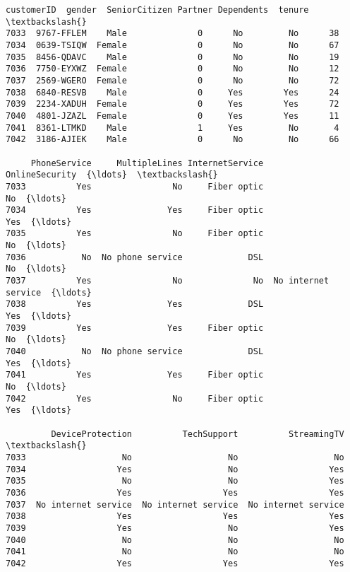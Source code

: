 \documentclass[11pt]{article}
\makeatletter
\newcommand{\boxspacing}{\kern\kvtcb@left@rule\kern\kvtcb@boxsep}
\newcommand{\prompt}[4]{
        {\ttfamily\llap{{\color{#2}[#3]:\hspace{3pt}#4}}\vspace{-\baselineskip}}
    }
\makeatother
\begin{document}
            \begin{tcolorbox}[breakable, size=fbox, boxrule=.5pt, pad at break*=1mm, opacityfill=0]
\prompt{Out}{outcolor}{7}{\boxspacing}
\begin{Verbatim}[commandchars=\\\{\}]
      customerID  gender  SeniorCitizen Partner Dependents  tenure  \textbackslash{}
7033  9767-FFLEM    Male              0      No         No      38
7034  0639-TSIQW  Female              0      No         No      67
7035  8456-QDAVC    Male              0      No         No      19
7036  7750-EYXWZ  Female              0      No         No      12
7037  2569-WGERO  Female              0      No         No      72
7038  6840-RESVB    Male              0     Yes        Yes      24
7039  2234-XADUH  Female              0     Yes        Yes      72
7040  4801-JZAZL  Female              0     Yes        Yes      11
7041  8361-LTMKD    Male              1     Yes         No       4
7042  3186-AJIEK    Male              0      No         No      66

     PhoneService     MultipleLines InternetService       OnlineSecurity  {\ldots}  \textbackslash{}
7033          Yes                No     Fiber optic                   No  {\ldots}
7034          Yes               Yes     Fiber optic                  Yes  {\ldots}
7035          Yes                No     Fiber optic                   No  {\ldots}
7036           No  No phone service             DSL                   No  {\ldots}
7037          Yes                No              No  No internet service  {\ldots}
7038          Yes               Yes             DSL                  Yes  {\ldots}
7039          Yes               Yes     Fiber optic                   No  {\ldots}
7040           No  No phone service             DSL                  Yes  {\ldots}
7041          Yes               Yes     Fiber optic                   No  {\ldots}
7042          Yes                No     Fiber optic                  Yes  {\ldots}

         DeviceProtection          TechSupport          StreamingTV  \textbackslash{}
7033                   No                   No                   No
7034                  Yes                   No                  Yes
7035                   No                   No                  Yes
7036                  Yes                  Yes                  Yes
7037  No internet service  No internet service  No internet service
7038                  Yes                  Yes                  Yes
7039                  Yes                   No                  Yes
7040                   No                   No                   No
7041                   No                   No                   No
7042                  Yes                  Yes                  Yes


\end{Verbatim}
\end{tcolorbox}
\end{document}
